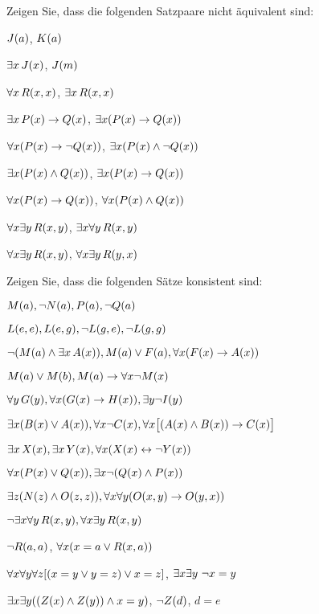\problempart
\label{pr.NotEquiv}
Zeigen Sie, dass die folgenden Satzpaare nicht äquivalent sind:
\begin{earg}
\item $\mathord{J}(a) $,  $\mathord{K}(a)$
\item $\exists x\, \mathord{J}(x)$,  $\mathord{J}(m)$
\item $\forall x\, \mathord{R}(x,x)$, $\exists x\, \mathord{R}(x,x)$
\item $\exists x\, \mathord{P}(x) \rightarrow \mathord{Q}(x)$, $\exists x (\mathord{P}(x) \rightarrow \mathord{Q}(x))$
\item $\forall x(\mathord{P}(x) \rightarrow \neg \mathord{Q}(x))$, $\exists x(\mathord{P}(x) \wedge \neg \mathord{Q}(x))$
\item $\exists x(\mathord{P}(x) \wedge \mathord{Q}(x))$, $\exists x(\mathord{P}(x) \rightarrow \mathord{Q}(x))$
\item $\forall x(\mathord{P}(x)\rightarrow \mathord{Q}(x))$, $\forall x(\mathord{P}(x) \wedge \mathord{Q}(x))$
\item $\forall x\exists y\, \mathord{R}(x,y)$, $\exists x\forall y\, \mathord{R}(x,y)$
\item $\forall x\exists y\, \mathord{R}(x,y)$, $\forall x\exists y\, \mathord{R}(y,x)$
\end{earg}

\problempart
Zeigen Sie, dass die folgenden Sätze konsistent sind:
\begin{earg}
\item  $\mathord{M}(a), \neg \mathord{N}(a), \mathord{P}(a), \neg \mathord{Q}(a)$
\item $\mathord{L}(e,e), \mathord{L}(e,g), \neg \mathord{L}(g,e), \neg \mathord{L}(g,g)$
\item $\neg (\mathord{M}(a) \wedge \exists x\, \mathord{A}(x)), \mathord{M}(a) \vee \mathord{F}(a), \forall x(\mathord{F}(x) \rightarrow \mathord{A}(x))$
\item $\mathord{M}(a) \vee \mathord{M}(b), \mathord{M}(a) \rightarrow \forall x \neg \mathord{M}(x)$
\item $\forall y\, \mathord{G}(y), \forall x (\mathord{G}(x) \rightarrow \mathord{H}(x)), \exists y \neg \mathord{I}(y)$
\item $\exists x(\mathord{B}(x) \vee \mathord{A}(x)), \forall x \neg \mathord{C}(x), \forall x\bigl[(\mathord{A}(x) \wedge \mathord{B}(x)) \rightarrow \mathord{C}(x)\bigr]$
\item $\exists x\, \mathord{X}(x), \exists x\, \mathord{Y}(x), \forall x(\mathord{X}(x) \leftrightarrow \neg \mathord{Y}(x))$
\item $\forall x(\mathord{P}(x) \vee \mathord{Q}(x)), \exists x\neg(\mathord{Q}(x) \wedge \mathord{P}(x))$
\item $\exists z(\mathord{N}(z) \wedge \mathord{O}(z,z)), \forall x\forall y(\mathord{O}(x,y) \rightarrow \mathord{O}(y,x))$
\item $\neg \exists x \forall y\, \mathord{R}(x,y), \forall x \exists y\, \mathord{R}(x,y)$
\item $\neg \mathord{R}(a,a)$, $\forall x (x=a \vee \mathord{R}(x,a))$
\item $\forall x\forall y\forall z[(x=y \vee y=z )\vee x=z]$, $\exists x\exists y\ \neg x= y$
\item $\exists x\exists y((\mathord{Z}(x) \wedge \mathord{Z}(y) )\wedge x=y)$, $\neg \mathord{Z}(d)$, $d=e$
\end{earg}

